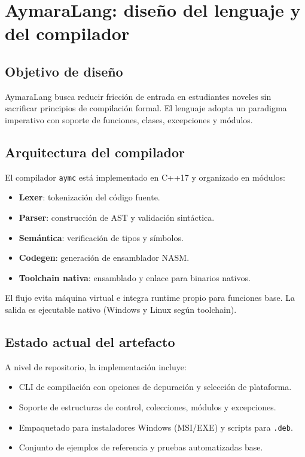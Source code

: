 \documentclass[11pt,a4paper]{article}
\begin{document}
\section{AymaraLang: dise\~no del lenguaje y del compilador}
\subsection{Objetivo de dise\~no}
AymaraLang busca reducir fricci\'on de entrada en estudiantes noveles sin sacrificar principios de compilaci\'on formal. El lenguaje adopta un paradigma imperativo con soporte de funciones, clases, excepciones y m\'odulos.

\subsection{Arquitectura del compilador}
El compilador \texttt{aymc} est\'a implementado en C++17 y organizado en m\'odulos:
\begin{itemize}[leftmargin=*,itemsep=2pt]
  \item \textbf{Lexer}: tokenizaci\'on del c\'odigo fuente.
  \item \textbf{Parser}: construcci\'on de AST y validaci\'on sint\'actica.
  \item \textbf{Sem\'antica}: verificaci\'on de tipos y s\'imbolos.
  \item \textbf{Codegen}: generaci\'on de ensamblador NASM.
  \item \textbf{Toolchain nativa}: ensamblado y enlace para binarios nativos.
\end{itemize}

El flujo evita m\'aquina virtual e integra runtime propio para funciones base. La salida es ejecutable nativo (Windows y Linux seg\'un toolchain).

\subsection{Estado actual del artefacto}
A nivel de repositorio, la implementaci\'on incluye:
\begin{itemize}[leftmargin=*,itemsep=2pt]
  \item CLI de compilaci\'on con opciones de depuraci\'on y selecci\'on de plataforma.
  \item Soporte de estructuras de control, colecciones, m\'odulos y excepciones.
  \item Empaquetado para instaladores Windows (MSI/EXE) y scripts para \texttt{.deb}.
  \item Conjunto de ejemplos de referencia y pruebas automatizadas base.
\end{itemize}
\end{document}
